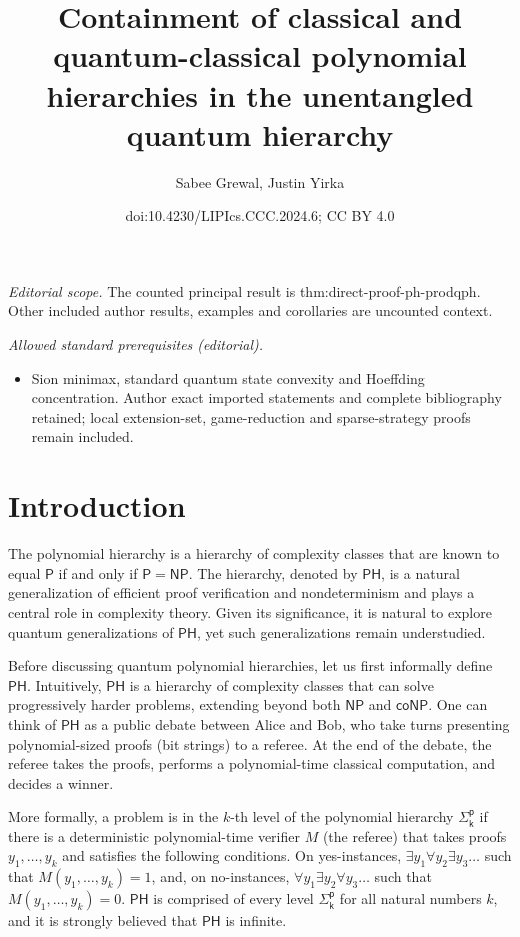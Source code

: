 \documentclass[10pt,a4paper]{article}
\title{Containment of classical and quantum-classical polynomial hierarchies in the unentangled quantum hierarchy}
\author{Sabee Grewal, Justin Yirka}
\date{doi:10.4230/LIPIcs.CCC.2024.6; CC BY 4.0}
\theoremstyle{definition}
\newcommand{\class}[1]{\ensuremath{\mathsf{#1}}\xspace}
\newcommand{\PTIME}{\class{P}}
\newcommand{\NP}{\class{NP}}
\newcommand{\coNP}{\class{coNP}}
\newcommand{\PH}{\class{PH}}
\newcommand{\Sigmai}[1][i]{\class{\Sigma^{p}_{#1}}}
\begin{document}
\maketitle
\noindent\textit{Editorial scope.} The counted principal result is thm:direct-proof-ph-prodqph. Other included author results, examples and corollaries are uncounted context.\par\medskip
\noindent\textit{Allowed standard prerequisites (editorial).}\begin{itemize}
\item Sion minimax, standard quantum state convexity and Hoeffding concentration. Author exact imported statements and complete bibliography retained; local extension-set, game-reduction and sparse-strategy proofs remain included.
\end{itemize}\medskip
\section{Introduction}\label{sec:intro}

The polynomial hierarchy \cite{meyer1972equivalence,stockmeyer1976polynomial} is a hierarchy of complexity classes that are known to equal $\PTIME$ if and only if $\PTIME = \NP$. 
The hierarchy, denoted by $\PH$, is a natural generalization of efficient proof verification and nondeterminism and plays a central role in complexity theory. 
Given its significance, it is natural to explore quantum generalizations of $\PH$, yet such generalizations remain understudied. 


Before discussing quantum polynomial hierarchies, let us first informally define $\PH$. 
Intuitively, $\PH$ is a hierarchy of complexity classes that can solve progressively harder problems, extending beyond both \NP and \coNP.
One can think of $\PH$ as a public debate between Alice and Bob, who take turns presenting polynomial-sized proofs (bit strings) to a referee. 
At the end of the debate, the referee takes the proofs, performs a polynomial-time classical computation, and decides a winner. 

More formally, a problem is in the $k$-th level of the polynomial hierarchy $\Sigmai[k]$ if there is a deterministic polynomial-time verifier $M$ (the referee) that takes proofs $y_1, \dots, y_k$ and satisfies the following conditions. On yes-instances, $\exists y_1 \forall y_2 \exists y_3 \ldots$ such that $M(y_1,\ldots,y_k)=1$, and, on no-instances, $\forall y_1 \exists y_2 \forall y_3 \ldots$ such that $M(y_1,\ldots,y_k)=0$. $\PH$ is comprised of every level $\Sigmai[k]$ for all natural numbers $k$, and it is strongly believed that $\PH$ is infinite.
\end{document}
